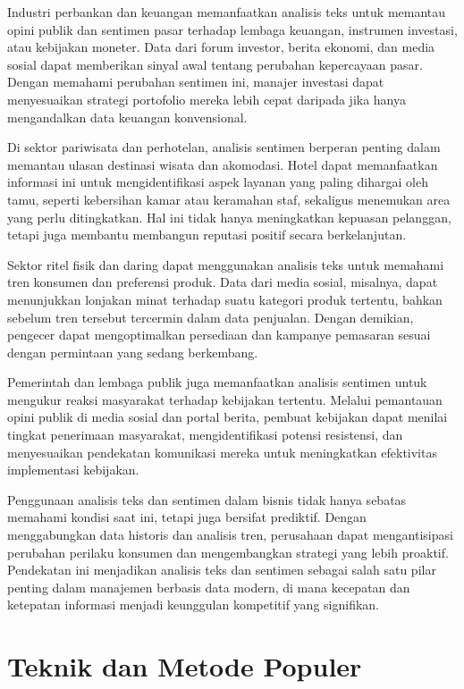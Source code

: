 Industri perbankan dan keuangan memanfaatkan analisis teks untuk memantau opini publik dan sentimen pasar terhadap lembaga keuangan, instrumen investasi, atau kebijakan moneter. Data dari forum investor, berita ekonomi, dan media sosial dapat memberikan sinyal awal tentang perubahan kepercayaan pasar. Dengan memahami perubahan sentimen ini, manajer investasi dapat menyesuaikan strategi portofolio mereka lebih cepat daripada jika hanya mengandalkan data keuangan konvensional.

Di sektor pariwisata dan perhotelan, analisis sentimen berperan penting dalam memantau ulasan destinasi wisata dan akomodasi. Hotel dapat memanfaatkan informasi ini untuk mengidentifikasi aspek layanan yang paling dihargai oleh tamu, seperti kebersihan kamar atau keramahan staf, sekaligus menemukan area yang perlu ditingkatkan. Hal ini tidak hanya meningkatkan kepuasan pelanggan, tetapi juga membantu membangun reputasi positif secara berkelanjutan.

Sektor ritel fisik dan daring dapat menggunakan analisis teks untuk memahami tren konsumen dan preferensi produk. Data dari media sosial, misalnya, dapat menunjukkan lonjakan minat terhadap suatu kategori produk tertentu, bahkan sebelum tren tersebut tercermin dalam data penjualan. Dengan demikian, pengecer dapat mengoptimalkan persediaan dan kampanye pemasaran sesuai dengan permintaan yang sedang berkembang.

Pemerintah dan lembaga publik juga memanfaatkan analisis sentimen untuk mengukur reaksi masyarakat terhadap kebijakan tertentu. Melalui pemantauan opini publik di media sosial dan portal berita, pembuat kebijakan dapat menilai tingkat penerimaan masyarakat, mengidentifikasi potensi resistensi, dan menyesuaikan pendekatan komunikasi mereka untuk meningkatkan efektivitas implementasi kebijakan.

Penggunaan analisis teks dan sentimen dalam bisnis tidak hanya sebatas memahami kondisi saat ini, tetapi juga bersifat prediktif. Dengan menggabungkan data historis dan analisis tren, perusahaan dapat mengantisipasi perubahan perilaku konsumen dan mengembangkan strategi yang lebih proaktif. Pendekatan ini menjadikan analisis teks dan sentimen sebagai salah satu pilar penting dalam manajemen berbasis data modern, di mana kecepatan dan ketepatan informasi menjadi keunggulan kompetitif yang signifikan.


\section{Teknik dan Metode Populer}

